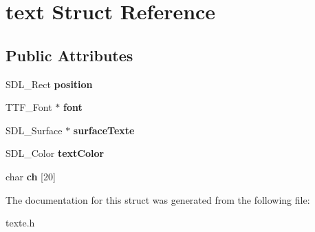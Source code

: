\hypertarget{structtext}{}\section{text Struct Reference}
\label{structtext}
\subsection*{Public Attributes}
\begin{DoxyCompactItemize}
\item 
\mbox{\label{structtext_ad41bb9d5e4c6a04146f4427914920f8f}} 
S\+D\+L\+\_\+\+Rect {\bfseries position}
\item 
\mbox{\label{structtext_aae2aa9c2d91befdf07b8c413987b7d64}} 
T\+T\+F\+\_\+\+Font $\ast$ {\bfseries font}
\item 
\mbox{\label{structtext_a6971afc50ab4ae6f86975961f469e073}} 
S\+D\+L\+\_\+\+Surface $\ast$ {\bfseries surface\+Texte}
\item 
\mbox{\label{structtext_a3e1549ce9ffc6809e840e274f876c41d}} 
S\+D\+L\+\_\+\+Color {\bfseries text\+Color}
\item 
\mbox{\label{structtext_a61233ab30d232078d6fed7b425c23193}} 
char {\bfseries ch} \mbox{[}20\mbox{]}
\end{DoxyCompactItemize}


The documentation for this struct was generated from the following file\+:\begin{DoxyCompactItemize}
\item 
texte.\+h\end{DoxyCompactItemize}
